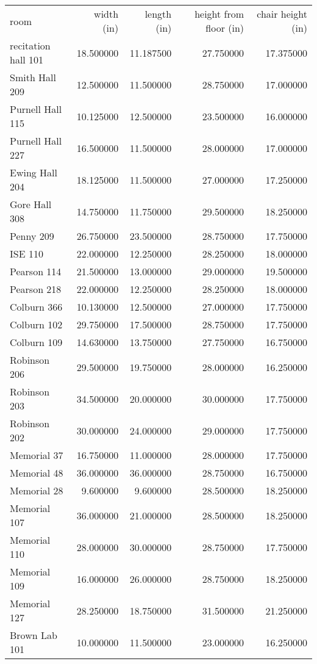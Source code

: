 \begin{tabular}{lrrrr}
room & width (in) & length (in) & height from floor (in) & chair height (in) \\
recitation hall 101 & 18.500000 & 11.187500 & 27.750000 & 17.375000 \\
Smith Hall 209 & 12.500000 & 11.500000 & 28.750000 & 17.000000 \\
Purnell Hall 115 & 10.125000 & 12.500000 & 23.500000 & 16.000000 \\
Purnell Hall 227 & 16.500000 & 11.500000 & 28.000000 & 17.000000 \\
Ewing Hall 204 & 18.125000 & 11.500000 & 27.000000 & 17.250000 \\
Gore Hall 308 & 14.750000 & 11.750000 & 29.500000 & 18.250000 \\
Penny 209 & 26.750000 & 23.500000 & 28.750000 & 17.750000 \\
ISE 110 & 22.000000 & 12.250000 & 28.250000 & 18.000000 \\
Pearson 114 & 21.500000 & 13.000000 & 29.000000 & 19.500000 \\
Pearson 218 & 22.000000 & 12.250000 & 28.250000 & 18.000000 \\
Colburn 366 & 10.130000 & 12.500000 & 27.000000 & 17.750000 \\
Colburn 102 & 29.750000 & 17.500000 & 28.750000 & 17.750000 \\
Colburn 109 & 14.630000 & 13.750000 & 27.750000 & 16.750000 \\
Robinson 206 & 29.500000 & 19.750000 & 28.000000 & 16.250000 \\
Robinson 203 & 34.500000 & 20.000000 & 30.000000 & 17.750000 \\
Robinson 202 & 30.000000 & 24.000000 & 29.000000 & 17.750000 \\
Memorial 37 & 16.750000 & 11.000000 & 28.000000 & 17.750000 \\
Memorial 48 & 36.000000 & 36.000000 & 28.750000 & 16.750000 \\
Memorial 28 & 9.600000 & 9.600000 & 28.500000 & 18.250000 \\
Memorial 107 & 36.000000 & 21.000000 & 28.500000 & 18.250000 \\
Memorial 110 & 28.000000 & 30.000000 & 28.750000 & 17.750000 \\
Memorial 109 & 16.000000 & 26.000000 & 28.750000 & 18.250000 \\
Memorial 127 & 28.250000 & 18.750000 & 31.500000 & 21.250000 \\
Brown Lab 101 & 10.000000 & 11.500000 & 23.000000 & 16.250000 \\

\end{tabular}
